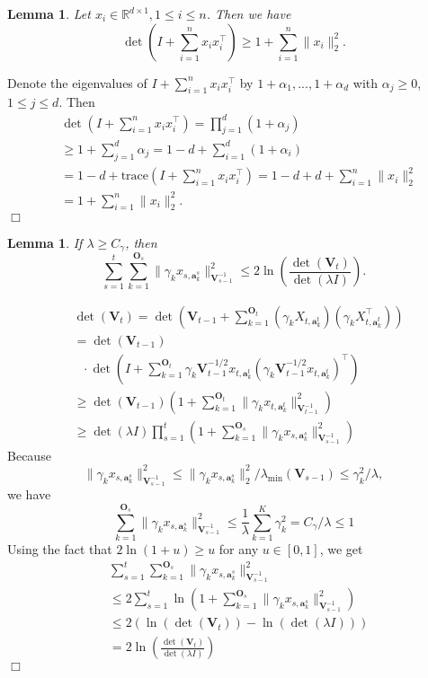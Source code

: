 \documentclass{article}
\newcommand{\RR}{\mathbb{R}}
\newcommand{\ba}{\mathbf{a}}
\newcommand{\bO}{\mathbf{O}}
\newcommand{\bV}{\mathbf{V}}
\newcommand{\trace}{\mathrm{trace}}
\newcommand{\norm}[1]{\| #1 \|}
\newtheorem{lemma}[theorem]{Lemma}%
\newenvironment{proof}{\noindent {\textbf{Proof. }}}{$\Box$ \medskip}
\begin{document}
\begin{lemma} %
Let $x_i \in \RR^{d \times 1}, 1 \leq i \leq n$. Then we have
$$
\det(I + \sum_{i=1}^n x_i x_i^{\top}) \geq 1 + \sum_{i=1}^n \norm{x_i}_2^2.
$$
\end{lemma}
\begin{proof}
Denote the eigenvalues of $I + \sum_{i=1}^n x_i x_i^{\top}$ by $1+\alpha_1,...,1+\alpha_d$ with $\alpha_j \geq 0$, $1\leq j\leq d$. Then
\begin{align*}
&\det(I + \sum_{i=1}^n x_i x_i^{\top})= \prod_{j=1}^d (1 + \alpha_j)\\
&\geq 1 +\sum_{j=1}^d \alpha_j =1-d + \sum_{i=1}^d (1+\alpha_i) \\
&=1-d + \trace(I + \sum_{i=1}^n x_i x_i^{\top})= 1-d + d + \sum_{i=1}^n \norm{x_i}_2^2\\
&=1 + \sum_{i=1}^n \norm{x_i}_2^2.
\end{align*}
\end{proof}

\begin{lemma}
If $\lambda \geq C_\gamma$, then
$$
\sum_{s=1}^t \sum_{k=1}^{\bO_s} \norm{\gamma_k x_{s,\ba_{k}^s}}_{\bV_{s-1}^{-1}}^2 \leq 2\ln(\frac{\det(\bV_t)}{\det(\lambda I)}).
$$
\end{lemma}
\begin{proof}
\begin{align*}
&\det(\bV_t) = \det(\bV_{t-1} + \sum_{k=1}^{\bO_t} (\gamma_k X_{t,\ba_k^{t}})(\gamma_k X_{t, \ba_k^{t}}^{\top}))\\
&=\det(\bV_{t-1})\\
&~~~\cdot \det(I + \sum_{k=1}^{\bO_t} \gamma_k \bV_{t-1}^{-1/2}x_{t,\ba_{k}^{t}} (\gamma_k \bV_{t-1}^{-1/2}x_{t,\ba_{k}^{t}})^{\top})\\
&\geq \det(\bV_{t-1}) (1 + \sum_{k=1}^{\bO_t} \norm{\gamma_k x_{t,\ba_k^t}}_{\bV_{t-1}^{-1}}^2)\\
&\geq \det(\lambda I)\prod_{s=1}^{t}(1 + \sum_{k=1}^{\bO_s} \norm{\gamma_k x_{s,\ba_k^s}}_{\bV_{s-1}^{-1}}^2)
\end{align*}
Because
$$
\norm{\gamma_k x_{s,\ba_k^s}}_{\bV_{s-1}^{-1}}^2 \leq \norm{\gamma_k x_{s,\ba_k^s}}_2^2/\lambda_{\min}(\bV_{s-1}) \leq \gamma_k^2 /\lambda,
$$
we have 
$$
\sum_{k=1}^{\bO_s} \norm{\gamma_k x_{s,\ba_k^s}}_{\bV_{s-1}^{-1}}^2 \leq \frac{1}{\lambda} \sum_{k=1}^{K} \gamma_k^2 = C_\gamma /\lambda \leq 1
$$
Using the fact that $ 2\ln(1+u) \geq u$ for any $u \in [0,1]$, we get
\begin{align*}
&\sum_{s=1}^t \sum_{k=1}^{\bO_s}\norm{\gamma_k x_{s,\ba_{k}^s}}_{\bV_{s-1}^{-1}}^2 \\
&\leq 2\sum_{s=1}^t\ln(1 + \sum_{k=1}^{\bO_s} \norm{\gamma_k x_{s,\ba_k^s}}_{\bV_{s-1}^{-1}}^2)\\
&\leq 2(\ln(\det(\bV_t)) - \ln(\det(\lambda I))) \\
&= 2 \ln(\frac{\det(\bV_t)}{\det(\lambda I)})
\end{align*}
\end{proof}
\end{document}
